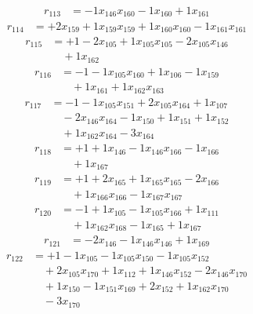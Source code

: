 \[\begin{aligned}
r_{113} &= - 1 x_{146} x_{160} - 1 x_{160} + 1 x_{161}
\end{aligned}\]
\[\begin{aligned}
r_{114} &= + 2 x_{159} + 1 x_{159} x_{159} + 1 x_{160} x_{160} - 1 x_{161} x_{161}
\end{aligned}\]
\[\begin{aligned}
r_{115} &= + 1 - 2 x_{105} + 1 x_{105} x_{105} - 2 x_{105} x_{146} \\
 &\quad + 1 x_{162}
\end{aligned}\]
\[\begin{aligned}
r_{116} &= - 1 - 1 x_{105} x_{160} + 1 x_{106} - 1 x_{159} \\
 &\quad + 1 x_{161} + 1 x_{162} x_{163}
\end{aligned}\]
\[\begin{aligned}
r_{117} &= - 1 - 1 x_{105} x_{151} + 2 x_{105} x_{164} + 1 x_{107} \\
 &\quad - 2 x_{146} x_{164} - 1 x_{150} + 1 x_{151} + 1 x_{152} \\
 &\quad + 1 x_{162} x_{164} - 3 x_{164}
\end{aligned}\]
\[\begin{aligned}
r_{118} &= + 1 + 1 x_{146} - 1 x_{146} x_{166} - 1 x_{166} \\
 &\quad + 1 x_{167}
\end{aligned}\]
\[\begin{aligned}
r_{119} &= + 1 + 2 x_{165} + 1 x_{165} x_{165} - 2 x_{166} \\
 &\quad + 1 x_{166} x_{166} - 1 x_{167} x_{167}
\end{aligned}\]
\[\begin{aligned}
r_{120} &= - 1 + 1 x_{105} - 1 x_{105} x_{166} + 1 x_{111} \\
 &\quad + 1 x_{162} x_{168} - 1 x_{165} + 1 x_{167}
\end{aligned}\]
\[\begin{aligned}
r_{121} &= - 2 x_{146} - 1 x_{146} x_{146} + 1 x_{169}
\end{aligned}\]
\[\begin{aligned}
r_{122} &= + 1 - 1 x_{105} - 1 x_{105} x_{150} - 1 x_{105} x_{152} \\
 &\quad + 2 x_{105} x_{170} + 1 x_{112} + 1 x_{146} x_{152} - 2 x_{146} x_{170} \\
 &\quad + 1 x_{150} - 1 x_{151} x_{169} + 2 x_{152} + 1 x_{162} x_{170} \\
 &\quad - 3 x_{170}
\end{aligned}\]
